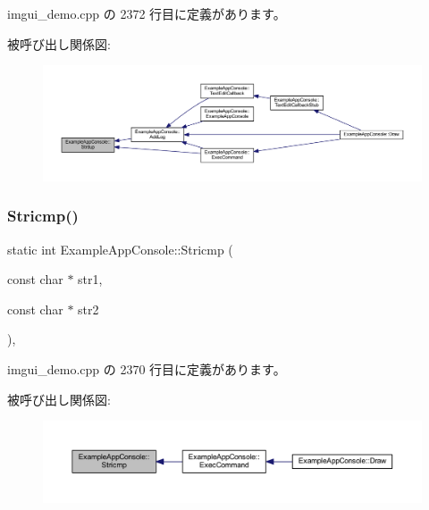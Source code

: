  imgui\+\_\+demo.\+cpp の 2372 行目に定義があります。

被呼び出し関係図\+:\nopagebreak
\begin{figure}[H]
\begin{center}
\leavevmode
\includegraphics[width=350pt]{struct_example_app_console_a61d0da41ef31ea8690b23681a1e54dba_icgraph}
\end{center}
\end{figure}
\mbox{\label{struct_example_app_console_a6e5e5d66e77618eff0f89785261c9391}} 
\subsubsection{\texorpdfstring{Stricmp()}{Stricmp()}}
{\footnotesize\ttfamily static int Example\+App\+Console\+::\+Stricmp (\begin{DoxyParamCaption}\item[{const char $\ast$}]{str1,  }\item[{const char $\ast$}]{str2 }\end{DoxyParamCaption})\hspace{0.3cm}{\ttfamily [inline]}, {\ttfamily [static]}}



 imgui\+\_\+demo.\+cpp の 2370 行目に定義があります。

被呼び出し関係図\+:\nopagebreak
\begin{figure}[H]
\begin{center}
\leavevmode
\includegraphics[width=350pt]{struct_example_app_console_a6e5e5d66e77618eff0f89785261c9391_icgraph}
\end{center}
\end{figure}
\mbox{\label{struct_example_app_console_a11bcb7a4b801e5eeb0c098c082fedc25}} 
